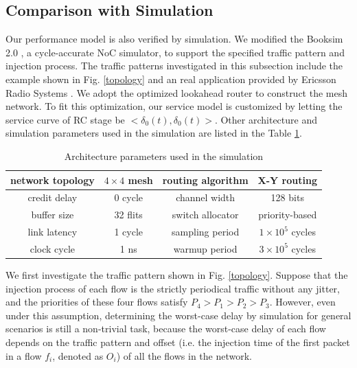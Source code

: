 \documentclass[preprint]{elsarticle}
\begin{document}
\subsection{Comparison with Simulation}\label{sim}
Our performance model is also verified by simulation. We modified the Booksim 2.0 \cite{6557149}, a cycle-accurate NoC simulator, to support the specified traffic pattern and injection process. The traffic patterns investigated in this subsection include the example shown in Fig. \ref{topology} and an real application provided by Ericsson Radio Systems \cite{LuJa08}\cite{Jafari1922089}. We adopt the optimized lookahead router \cite{jerger2009chip} to construct the mesh network. To fit this optimization, our service model is customized by letting the service curve of RC stage be $<\delta_0(t),\delta_0(t)>$. Other architecture and simulation parameters used in the simulation are listed in the Table \ref{arcpara}.
\begin{table}[htbp]
\centering
\caption{\label{arcpara}Architecture parameters used in the simulation}
\begin{tabular}{|c|c||c|c|}
\hline
network topology    & $4\times 4$ mesh  &   routing algorithm & X-Y routing\\
\hline
credit delay &  0 cycle &   channel width   & 128 bits\\
\hline
buffer size &   32 flits  &   switch allocator    &   priority-based\\
\hline
link latency    &   1 cycle    & sampling period &   $1\times 10^5$ cycles\\
\hline
clock cycle &   1 ns    &   warmup period   &   $3\times 10^5$ cycles\\
\hline
\end{tabular}
\end{table}

We first investigate the traffic pattern shown in Fig. \ref{topology}. Suppose that the injection process of each flow is the strictly periodical traffic without any jitter, and the priorities of these four flows satisfy $P_4>P_1>P_2>P_3$. However, even under this assumption, determining the worst-case delay by simulation for general scenarios is still a non-trivial task, because the worst-case delay of each flow depends on the traffic pattern and offset (i.e. the injection time of the first packet in a flow $f_i$, denoted as $O_i$) of all the flows in the network.
\end{document}
